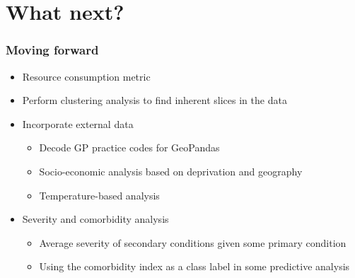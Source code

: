 \section{What next?}
\begin{frame}
    \frametitle{Moving forward}
    \begin{itemize}
        \pause%
        \item Resource consumption metric
        \pause%
        \item Perform clustering analysis to find inherent slices in the data
        \pause%
        \item Incorporate external data
        \begin{itemize}
            \item Decode GP practice codes for GeoPandas
            \item Socio-economic analysis based on deprivation and geography
            \item Temperature-based analysis
        \end{itemize}
        \pause%
        \item Severity and comorbidity analysis
        \begin{itemize}
            \item Average severity of secondary conditions given some primary
                condition
            \item Using the comorbidity index as a class label in some
                predictive analysis
        \end{itemize}
    \end{itemize}
\end{frame}
